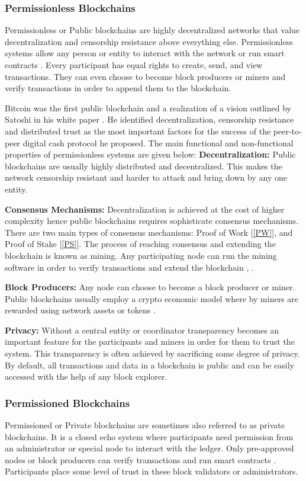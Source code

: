 \subsubsection{Permissionless Blockchains} 
Permissionless or Public blockchains are highly decentralized networks that value decentralization and censorship resistance above everything else. Permissionless systems allow any person or entity to interact with the network or run smart contracts \cite{arXiv:1806.03693}. Every participant has equal rights to create, send, and view transactions. They can even choose to become block producers or miners and verify transactions in order to append them to the blockchain. 

Bitcoin was the first public blockchain and a realization of a vision outlined by Satoshi in his white paper \cite{paper:001}. He identified decentralization, censorship resistance and distributed trust as the most important factors for the success of the peer-to-peer digital cash protocol he proposed. The main functional and non-functional properties of permissionless systems are given below:
\clearpage
\textbf{Decentralization:}
Public blockchains are usually highly distributed and decentralized. This makes the network censorship resistant and harder to attack and bring down by any one entity. 

\textbf{Consensus Mechanisms:}
Decentralization is achieved at the cost of higher complexity hence public blockchains requires sophisticate consensus mechanisms. There are two main types of consensus mechanisms: Proof of Work [\ref{PW}], and Proof of Stake [\ref{PS}]. The process of reaching consensus and extending the blockchain is known as mining. Any participating node can run the mining software in order to verify transactions and extend the blockchain \cite{arXiv:1806.03693}, \cite{misc:017}.

\textbf{Block Producers:}
Any node can choose to become a block producer or miner. Public blockchains usually employ a crypto economic model where by miners are rewarded using network assets or tokens \cite{paper:001}.

\textbf{Privacy:}
Without a central entity or coordinator transparency becomes an important feature for the participants and miners in order for them to trust the system. This transparency is often achieved by sacrificing some degree of privacy. By default, all transactions and data in a blockchain is public and can be easily accessed with the help of any block explorer.  
\vspace{1cm}
\subsubsection{Permissioned Blockchains}
Permissioned or Private blockchains are sometimes also referred to as private blockchains. It is a closed echo system where participants need permission from an administrator or special node to interact with the ledger. Only pre-approved nodes or block producers can verify transactions and run smart contracts \cite{arXiv:1806.03693}. Participants place some level of trust in these block validators or administrators. 

